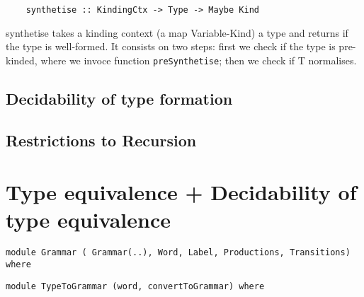 \begin{lstlisting}
    synthetise :: KindingCtx -> Type -> Maybe Kind
\end{lstlisting}

synthetise takes a kinding context (a map Variable-Kind) a type and returns if the type is well-formed. It consists on two steps: first we check if the type is pre-kinded, where we invoce function \lstinline{preSynthetise}; then we check if T normalises. 


\subsection{Decidability of type formation}
\subsection{Restrictions to Recursion}

\section{Type equivalence + Decidability of type equivalence}
\begin{lstlisting}
module Grammar ( Grammar(..), Word, Label, Productions, Transitions) where
\end{lstlisting}

\begin{lstlisting}
module TypeToGrammar (word, convertToGrammar) where
\end{lstlisting}
\LIMPA